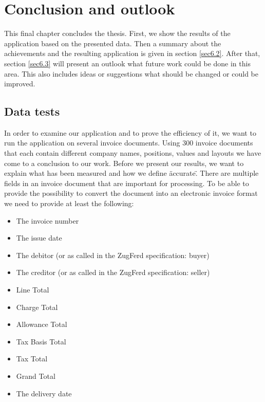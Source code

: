 %
% 
\chapter{Conclusion and outlook}
\label{cha6}

This final chapter concludes the thesis. First, we show the results of the application based on the presented data. Then a summary about the achievements and the resulting application is given in section \ref{sec6.2}. After that, section \ref{sec6.3} will present an outlook what future work could be done in this area. This also includes ideas or suggestions what should be changed or could be improved.

\section{Data tests}
In order to examine our application and to prove the efficiency of it, we want to run the application on several invoice documents. Using 300 invoice documents that each contain different company names, positions, values and layouts we have come to a conclusion to our work.
Before we present our results, we want to explain what has been measured and how we define \"accurate\".
There are multiple fields in an invoice document that are important for processing. To be able to provide the possibility to convert the document into an electronic invoice format we need to provide at least the following:
\begin{itemize}
\itemsep -1em 
	\item The invoice number
	\item The issue date
	\item The debitor (or as called in the ZugFerd specification: buyer)
	\item The creditor (or as called in the ZugFerd specification: seller)
	\item Line Total
	\item Charge Total
	\item Allowance Total
	\item Tax Basis Total
	\item Tax Total
	\item Grand Total
	\item The delivery date
\end{itemize}

